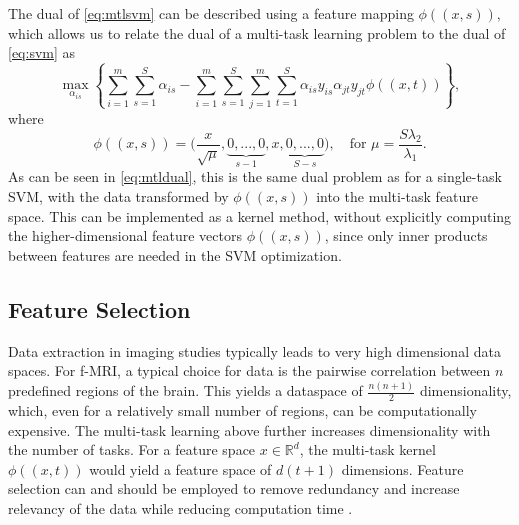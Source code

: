 \documentclass{llncs}
\begin{document}
The dual of \eqref{eq:mtlsvm} can be described using a feature mapping
$\phi((x,s)),$ which allows us to relate the dual of a multi-task learning
problem to the dual of \eqref{eq:svm} as
\begin{equation}
\label{eq:mtldual}
\max_{\alpha_{is}}  \left\{ \sum_{i=1}^m\sum_{s=1}^S \alpha_{is} -  \sum_{i=1}^m\sum_{s=1}^S\sum_{j=1}^m\sum_{t=1}^S  \alpha_{is}y_{is}\alpha_{jt}y_{jt}\phi((x,t))      \right\},
\end{equation}
where
\begin{equation}
\phi((x,s)) = \Big(\frac{x}{\sqrt{\mu}}, \underbrace{0,...,0}_{s-1}, x,
\underbrace{0,...,0}_{S-s} \Big), \quad \text{for  } \mu = \frac{S \lambda_2}{\lambda_1} .
\end{equation}
As can be seen in \eqref{eq:mtldual}, this is the same dual problem as for a
single-task SVM, with the data transformed by $\phi((x,s))$ into the multi-task
feature space. This can be implemented as a kernel method, without explicitly
computing the higher-dimensional feature vectors $\phi((x,s))$, since only inner
products between features are needed in the SVM optimization.




\subsection{Feature Selection}
\label{subsec:FS}
Data extraction in imaging studies typically leads to very high dimensional data spaces.  For f-MRI, a typical choice for data is the pairwise correlation between $n$ predefined regions of the brain.  This yields a dataspace of $\frac{n(n+1)}{2}$ dimensionality, which, even for a relatively small number of regions, can be  computationally expensive.  The multi-task learning above further increases dimensionality with the number of tasks. For a feature space $x \in \mathbb{R}^d$, the multi-task kernel $\phi((x,t))$ would yield a feature space of $d(t+1)$ dimensions.  Feature selection can and should be employed to remove redundancy and increase relevancy of the data while reducing computation time \cite{featsel}.
\end{document}
